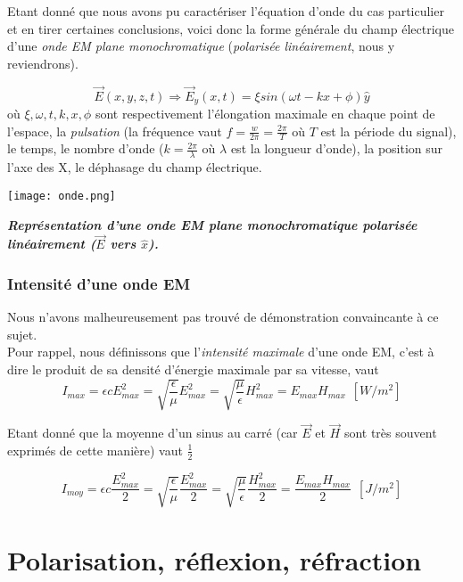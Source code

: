 \documentclass[a4paper,12pt]{article}
\begin{document}
Etant donné que nous avons pu caractériser l'équation d'onde du cas particulier et en tirer certaines conclusions, 
voici donc la forme générale du champ électrique d'une \textit{onde EM plane monochromatique} (\textit{polarisée linéairement}, nous y reviendrons).

\[\vec{E}(x,y,z,t) \Rightarrow \vec{E}_{y}(x,t) = \xi sin(\omega t - k x + \phi) \hat{y} \]
où $\xi,\omega,t,k,x,\phi$ sont respectivement l'élongation maximale en chaque point de l'espace, la \textit{pulsation} (la fréquence  vaut $f = \frac{w}{2 \pi} = \frac{2\pi}{T}$ où $T$ 
est la période du signal), le temps, le nombre d'onde ($k = \frac{2\pi}{\lambda}$ où $\lambda$ est la longueur d'onde), la position sur l'axe des X, le déphasage  du champ électrique. 

\texttt{[image: onde.png]}

\textit{\textbf{Représentation d'une onde EM plane monochromatique polarisée linéairement ($\vec{E}$ vers $\hat{x}$).}}

\subsubsection{Intensité d'une onde EM}  %
Nous n'avons malheureusement pas trouvé de démonstration convaincante à ce sujet. \\
Pour rappel, nous définissons que l'\textit{intensité maximale} d'une onde EM, c'est à dire 
le produit de sa densité d'énergie maximale par sa vitesse, vaut 
\[I_{max} = \epsilon c E_{max}^{2} = \sqrt{\frac{\epsilon}{\mu}}E_{max}^{2} = \sqrt{\frac{\mu}{\epsilon}}H_{max}^{2} = E_{max} H_{max} \hspace{5pt} [W/m^{2}]\]

Etant donné que la moyenne d'un sinus au carré (car $\vec{E}$ et $\vec{H}$ sont très souvent exprimés de cette manière) vaut $\frac{1}{2}$

\[I_{moy} = \epsilon c \frac{E_{max}^{2}}{2} = \sqrt{\frac{\epsilon}{\mu}}\frac{E_{max}^{2}}{2} = \sqrt{\frac{\mu}{\epsilon}}\frac{H_{max}^{2}}{2} = \frac{E_{max} H_{max}}{2} \hspace{5pt} [J/m^{2}]\] 

\newpage

\section{Polarisation, réflexion, réfraction}
\end{document}
